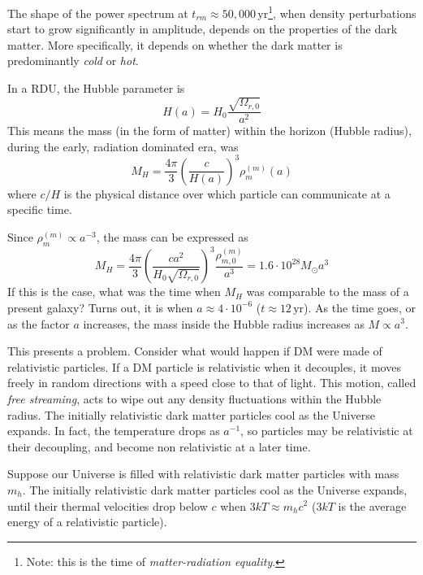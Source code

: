 The shape of the power spectrum at $t_{rm} \approx 50,000\,\text{yr}$\footnote{Note: this is the time of \emph{matter-radiation equality}.}, when density perturbations start to grow significantly in amplitude, depends on the properties of the dark matter. More specifically, it depends on whether the dark matter is predominantly \emph{cold} or \emph{hot}.
\par In a RDU, the Hubble parameter is 
\begin{equation*}
    H(a) = H_{0}\frac{\sqrt{\Omega_{r,0}}}{a^{2}}
\end{equation*}
This means the mass (in the form of matter) within the horizon (Hubble radius), during the early, radiation dominated era, was
\begin{equation*}
    M_{H} = \frac{4\pi}{3}\left(\frac{c}{H(a)}\right)^{3}\rho^{(m)}_{m}(a)
\end{equation*}
where $c/H$ is the physical distance over which particle can communicate at a specific time.
\par Since $\rho^{(m)}_{m} \propto a^{-3}$, the mass can be expressed as
\begin{equation*}
    M_{H} = \frac{4\pi}{3}\left(\frac{ca^{2}}{H_{0}\sqrt{\Omega_{r,0}}}\right)^{3}\frac{\rho^{(m)}_{m,0}}{a^{3}} = 1.6\cdot 10^{28}M_{\odot}a^{3}
\end{equation*}
If this is the case, what was the time when $M_{H}$ was comparable to the mass of a present galaxy? Turns out, it is when $a \approx 4\cdot 10^{-6}$ ($t\approx 12\,\text{yr}$). As the time goes, or as the factor $a$ increases, the mass inside the Hubble radius increases as $M \propto a^{3}$.
\par This presents a problem. Consider what would happen if DM were made of relativistic particles. If a DM particle is relativistic when it decouples, it moves freely in random directions with a speed close to that of light. This motion, called \emph{free streaming}, acts to wipe out any density fluctuations within the Hubble radius. The initially relativistic dark matter particles cool as the Universe expands. In fact, the temperature drops as $a^{-1}$, so particles may be relativistic at their decoupling, and become non relativistic at a later time.
\par Suppose our Universe is filled with relativistic dark matter particles with mass $m_{h}$. The initially relativistic dark matter particles cool as the Universe expands, until their thermal velocities drop below $c$ when $3kT\approx m_{h}c^{2}$ ($3kT$ is the average energy of a relativistic particle).
